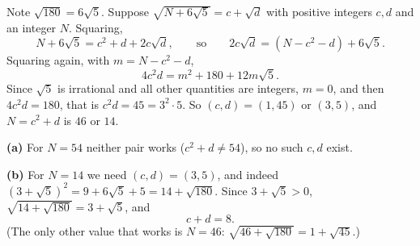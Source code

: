 Note $\sqrt{180}=6\sqrt5$. Suppose $\sqrt{N+6\sqrt5}=c+\sqrt d$ with positive integers $c,d$ and an integer $N$. Squaring,
\[
N+6\sqrt5=c^2+d+2c\sqrt d,\qquad\text{so}\qquad 2c\sqrt d=(N-c^2-d)+6\sqrt5 .
\]
Squaring again, with $m=N-c^2-d$,
\[
4c^2d=m^2+180+12m\sqrt5 .
\]
Since $\sqrt5$ is irrational and all other quantities are integers, $m=0$, and then $4c^2d=180$, that is $c^2d=45=3^2\cdot5$. So $(c,d)=(1,45)$ or $(3,5)$, and $N=c^2+d$ is $46$ or $14$.

\textbf{(a)} For $N=54$ neither pair works ($c^2+d\ne54$), so no such $c,d$ exist.

\textbf{(b)} For $N=14$ we need $(c,d)=(3,5)$, and indeed $(3+\sqrt5)^2=9+6\sqrt5+5=14+\sqrt{180}$. Since $3+\sqrt5>0$, $\sqrt{14+\sqrt{180}}=3+\sqrt5$, and
\[
c+d=\boxed{8}.
\]
(The only other value that works is $N=46$: $\sqrt{46+\sqrt{180}}=1+\sqrt{45}$.)
